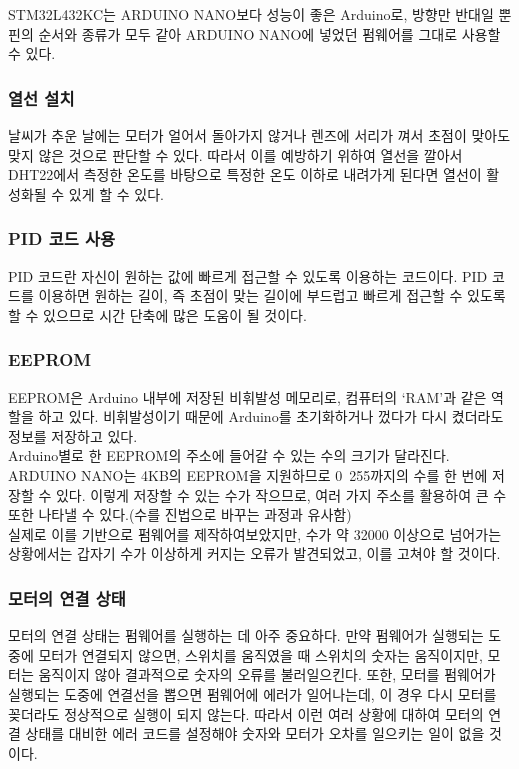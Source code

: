 STM32L432KC는 ARDUINO NANO보다 성능이 좋은 Arduino로, 방향만 반대일 뿐 핀의 순서와 종류가 모두 같아 ARDUINO NANO에 넣었던 펌웨어를 그대로 사용할 수 있다.

\subsubsection{열선 설치}

날씨가 추운 날에는 모터가 얼어서 돌아가지 않거나 렌즈에 서리가 껴서 초점이 맞아도 맞지 않은 것으로 판단할 수 있다. 따라서 이를 예방하기 위하여 열선을 깔아서 DHT22에서 측정한 온도를 바탕으로 특정한 온도 이하로 내려가게 된다면 열선이 활성화될 수 있게 할 수 있다.

\subsubsection{PID 코드 사용}

PID 코드란 자신이 원하는 값에 빠르게 접근할 수 있도록 이용하는 코드이다. PID 코드를 이용하면 원하는 길이, 즉 초점이 맞는 길이에 부드럽고 빠르게 접근할 수 있도록 할 수 있으므로 시간 단축에 많은 도움이 될 것이다.

\subsubsection{EEPROM}

EEPROM은 Arduino 내부에 저장된 비휘발성 메모리로, 컴퓨터의 ‘RAM’과 같은 역할을 하고 있다. 비휘발성이기 때문에 Arduino를 초기화하거나 껐다가 다시 켰더라도 정보를 저장하고 있다.\\
Arduino별로 한 EEPROM의 주소에 들어갈 수 있는 수의 크기가 달라진다. ARDUINO NANO는 4KB의 EEPROM을 지원하므로 0~255까지의 수를 한 번에 저장할 수 있다. 이렇게 저장할 수 있는 수가 작으므로, 여러 가지 주소를 활용하여 큰 수 또한 나타낼 수 있다.(수를 진법으로 바꾸는 과정과 유사함)\\
실제로 이를 기반으로 펌웨어를 제작하여보았지만, 수가 약 32000 이상으로 넘어가는 상황에서는 갑자기 수가 이상하게 커지는 오류가 발견되었고, 이를 고쳐야 할 것이다.

\subsubsection{모터의 연결 상태}

모터의 연결 상태는 펌웨어를 실행하는 데 아주 중요하다. 만약 펌웨어가 실행되는 도중에 모터가 연결되지 않으면, 스위치를 움직였을 때 스위치의 숫자는 움직이지만, 모터는 움직이지 않아 결과적으로 숫자의 오류를 불러일으킨다. 또한, 모터를 펌웨어가 실행되는 도중에 연결선을 뽑으면 펌웨어에 에러가 일어나는데, 이 경우 다시 모터를 꽂더라도 정상적으로 실행이 되지 않는다. 따라서 이런 여러 상황에 대하여 모터의 연결 상태를 대비한 에러 코드를 설정해야 숫자와 모터가 오차를 일으키는 일이 없을 것이다.

